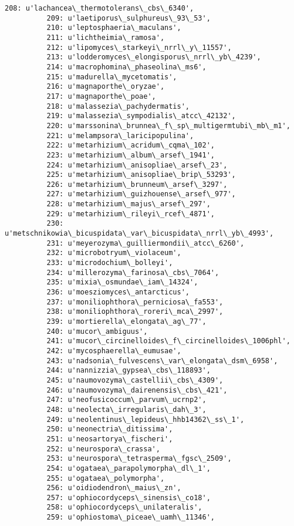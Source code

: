 \documentclass[11pt]{article}
\begin{document}
\begin{Verbatim}[commandchars=\\\{\}]
          208: u'lachancea\_thermotolerans\_cbs\_6340',
          209: u'laetiporus\_sulphureus\_93\_53',
          210: u'leptosphaeria\_maculans',
          211: u'lichtheimia\_ramosa',
          212: u'lipomyces\_starkeyi\_nrrl\_y\_11557',
          213: u'lodderomyces\_elongisporus\_nrrl\_yb\_4239',
          214: u'macrophomina\_phaseolina\_ms6',
          215: u'madurella\_mycetomatis',
          216: u'magnaporthe\_oryzae',
          217: u'magnaporthe\_poae',
          218: u'malassezia\_pachydermatis',
          219: u'malassezia\_sympodialis\_atcc\_42132',
          220: u'marssonina\_brunnea\_f\_sp\_multigermtubi\_mb\_m1',
          221: u'melampsora\_laricipopulina',
          222: u'metarhizium\_acridum\_cqma\_102',
          223: u'metarhizium\_album\_arsef\_1941',
          224: u'metarhizium\_anisopliae\_arsef\_23',
          225: u'metarhizium\_anisopliae\_brip\_53293',
          226: u'metarhizium\_brunneum\_arsef\_3297',
          227: u'metarhizium\_guizhouense\_arsef\_977',
          228: u'metarhizium\_majus\_arsef\_297',
          229: u'metarhizium\_rileyi\_rcef\_4871',
          230: u'metschnikowia\_bicuspidata\_var\_bicuspidata\_nrrl\_yb\_4993',
          231: u'meyerozyma\_guilliermondii\_atcc\_6260',
          232: u'microbotryum\_violaceum',
          233: u'microdochium\_bolleyi',
          234: u'millerozyma\_farinosa\_cbs\_7064',
          235: u'mixia\_osmundae\_iam\_14324',
          236: u'moesziomyces\_antarcticus',
          237: u'moniliophthora\_perniciosa\_fa553',
          238: u'moniliophthora\_roreri\_mca\_2997',
          239: u'mortierella\_elongata\_ag\_77',
          240: u'mucor\_ambiguus',
          241: u'mucor\_circinelloides\_f\_circinelloides\_1006phl',
          242: u'mycosphaerella\_eumusae',
          243: u'nadsonia\_fulvescens\_var\_elongata\_dsm\_6958',
          244: u'nannizzia\_gypsea\_cbs\_118893',
          245: u'naumovozyma\_castellii\_cbs\_4309',
          246: u'naumovozyma\_dairenensis\_cbs\_421',
          247: u'neofusicoccum\_parvum\_ucrnp2',
          248: u'neolecta\_irregularis\_dah\_3',
          249: u'neolentinus\_lepideus\_hhb14362\_ss\_1',
          250: u'neonectria\_ditissima',
          251: u'neosartorya\_fischeri',
          252: u'neurospora\_crassa',
          253: u'neurospora\_tetrasperma\_fgsc\_2509',
          254: u'ogataea\_parapolymorpha\_dl\_1',
          255: u'ogataea\_polymorpha',
          256: u'oidiodendron\_maius\_zn',
          257: u'ophiocordyceps\_sinensis\_co18',
          258: u'ophiocordyceps\_unilateralis',
          259: u'ophiostoma\_piceae\_uamh\_11346',

\end{Verbatim}
\end{document}
